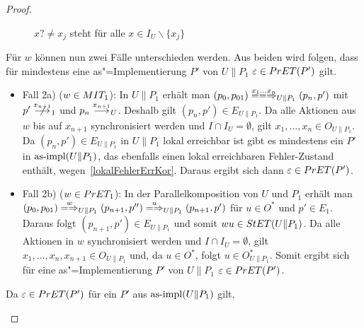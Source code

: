 \begin{proof}
\begin{itemize}
\begin{figure} [h!tbp]
\begin{center}
        \caption{$x?\neq x_j$ steht für alle $x\in I_U\backslash\{x_j\}$}
      \label{UohneE}
      \end{center}
      \end{figure}
      Für $w$ können nun zwei Fälle unterschieden werden. Aus beiden wird
      folgen, dass für mindestens eine as"=Implementierung $P'$ von $U\|P_1$
      $\varepsilon\in PrET(P')$ gilt.
      \begin{itemize}
        \item Fall 2a) ($w\in MIT _1$): In $U\|P_1$ erhält man $(p_0,p_{01})
          \lweakmay[x_1\dots x_n]_{U\|P_1} (p_n,p')$ mit $p'\nmust[x_{n+1}]_1$
          und $p_n\must[x_{n+1}]_U$. Deshalb gilt $(p_n,p')\in E_{U\|P_1}$. Da
          alle Aktionen aus $w$ bis auf $x_{n+1}$ synchronisiert werden und
          $I\cap I_U=\emptyset$, gilt $x_1,\dots , x_n\in O_{U\|P_1}$. Da
          $(p_n,p')\in E_{U\|P_1}$ in $U\|P_1$ lokal erreichbar ist gibt es
          mindestens ein $P'$ in $\mathrm{as}\text{-}\mathrm{impl} (U\|P_1)$, das ebenfalls einen lokal
          erreichbaren Fehler-Zustand enthält, wegen~\ref{lokalFehlerErrKor}.
          Daraus ergibt sich dann $\varepsilon\in PrET (P')$.
        \item Fall 2b) ($w\in PrET _1$): In der Parallelkomposition von $U$ und
          $P_1$ erhält man $(p_0,p_{01}) \weakmay[w]_{U\|P_1} (p_{n+1},p'')
          \weakmay[u]_{U\|P_1} (p_{n+1},p')$ für $u\in O^*$ und $p'\in E_1$.
          Daraus folgt $(p_{n+1},p')\in E_{U\|P_1}$ und somit $wu\in StET
          (U\|P_1)$. Da alle Aktionen in $w$ synchronisiert werden und $I\cap
          I_U=\emptyset$, gilt $x_1,\dots ,x_n,x_{n+1}\in O_{U\|P_1}$ und, da
          $u\in O^*$, folgt $u\in O_{U\|P_1}^*$. Somit ergibt sich für eine
          as"=Implementierung $P'$ von $U\|P_1$ $\varepsilon\in PrET (P')$.
      \end{itemize}
      Da $\varepsilon\in PrET (P')$ für ein $P'$ aus $\mathrm{as}\text{-}\mathrm{impl} (U\|P_1)$ gilt,

\end{itemize}
\end{proof}
